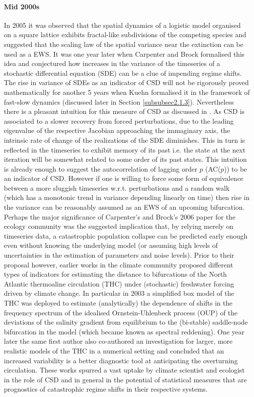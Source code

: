 \documentclass[../main.tex]{subfiles}
\begin{document}
\paragraph{Mid 2000s}
In 2005 it was observed \cite{Oborny05} that the spatial dynamics of a logistic model organised on a square lattice exhibits fractal-like subdivisions of the competing species and suggested that the scaling law of the spatial variance near the extinction can be used as a EWS. 
It was one year later when Carpenter and Brock \cite{Carpenter06} formalised this idea and conjectured how increases in the variance of the timeseries of a stochastic differential equation (SDE) can be a clue of impending regime shifts.
The rise in variance of SDEs as an indicator of CSD will not be rigorously proved mathematically for another 5 years when Kuehn \cite{Kuehn11} formalised it in the framework of fast-slow dynamics (discussed later in Section \ref{subsubsec2.1.3}).
Nevertheless there is a pleasant intuition for this measure of CSD as discussed in \cite{Scheffer09}. 
As CSD is associated to a slower recovery from forced perturbations, due to the leading eigenvalue of the respective Jacobian approaching the immaginary axis, the intrinsic rate of change of the realizations of the SDE diminishes. 
This in turn is reflected in the timeseries to exhibit memory of its past i.e. the state at the next iteration will be somewhat related to some order of its past states. 
This intuition is already enough to suggest the autocorrelation of lagging order $p$ (AC($p$)) to be an indicator of CSD.
However if one is willing to force some form of equivalence between a more sluggish timeseries w.r.t. perturbations and a random walk (which has a monotonic trend in variance depending linearly on time) then rise in the variance can be reasonably assumed as an EWS of an upcoming bifurcation.
Perhaps the major significance of Carpenter's and Brock's 2006 paper for the ecology community was the suggested implication that, by relying merely on timeseries data, a catastrophic population collapse can be predicted early enough even without knowing the underlying model (or assuming high levels of uncertainties in the estimation of parameters and noise levels). 
Prior to their proposal however, earlier works in the climate community proposed different types of indicators for estimating the distance to bifurcations of the North Atlantic thermoaline circulation (THC) under (stochastic) freshwater forcing driven by climate change. 
In particular in 2003 a simplified box model of the THC was deployed to estimate (analytically) the dependence of shifts in the frequency spectrum of the idealised Ornstein-Uhlenbeck process (OUP) of the deviations of the salinity gradient from equilibrium to the (bi-stable) saddle-node bifurcation in the model \cite{Kleinen03} (which became known as spectral reddening).
One year later the same first author also co-authored an investigation for larger, more realistic models of the THC in a numerical setting \cite{Held04} and concluded that an increased variability is a better diagnostic tool at anticipating the overturning circulation.
These works spurred a vast uptake by climate scientist and ecologist in the role of CSD and in general in the potential of statistical measures that are prognostics of catastrophic regime shifts in their respective systems.
\end{document}
